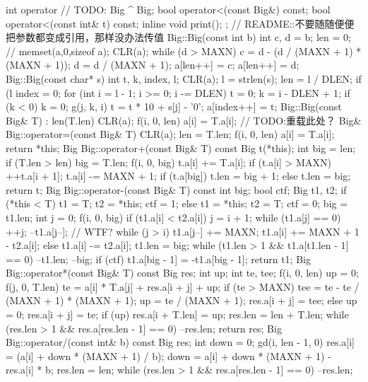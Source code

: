 \begin{cppcode}
{  int operator%
  // TODO: Big ^ Big;
  bool operator<(const Big&) const;
  bool operator<(const int& t) const;
  inline void print();
};
// README::不要随随便便把参数都变成引用，那样没办法传值
Big::Big(const int b) {
  int c, d = b;
  len = 0;
  // memset(a,0,sizeof a);
  CLR(a);
  while (d > MAXN) {
    c = d - (d / (MAXN + 1) * (MAXN + 1));
    d = d / (MAXN + 1);
    a[len++] = c;
  }
  a[len++] = d;
}
Big::Big(const char* s) {
  int t, k, index, l;
  CLR(a);
  l = strlen(s);
  len = l / DLEN;
  if (l %
  index = 0;
  for (int i = l - 1; i >= 0; i -= DLEN) {
    t = 0;
    k = i - DLEN + 1;
    if (k < 0) k = 0;
    g(j, k, i) t = t * 10 + s[j] - '0';
    a[index++] = t;
  }
}
Big::Big(const Big& T) : len(T.len) {
  CLR(a);
  f(i, 0, len) a[i] = T.a[i];
  // TODO:重载此处？
}
Big& Big::operator=(const Big& T) {
  CLR(a);
  len = T.len;
  f(i, 0, len) a[i] = T.a[i];
  return *this;
}
Big Big::operator+(const Big& T) const {
  Big t(*this);
  int big = len;
  if (T.len > len) big = T.len;
  f(i, 0, big) {
    t.a[i] += T.a[i];
    if (t.a[i] > MAXN) {
      ++t.a[i + 1];
      t.a[i] -= MAXN + 1;
    }
  }
  if (t.a[big])
    t.len = big + 1;
  else
    t.len = big;
  return t;
}
Big Big::operator-(const Big& T) const {
  int big;
  bool ctf;
  Big t1, t2;
  if (*this < T) {
    t1 = T;
    t2 = *this;
    ctf = 1;
  } else {
    t1 = *this;
    t2 = T;
    ctf = 0;
  }
  big = t1.len;
  int j = 0;
  f(i, 0, big) {
    if (t1.a[i] < t2.a[i]) {
      j = i + 1;
      while (t1.a[j] == 0) ++j;
      --t1.a[j--];
      // WTF?
      while (j > i) t1.a[j--] += MAXN;
      t1.a[i] += MAXN + 1 - t2.a[i];
    } else
      t1.a[i] -= t2.a[i];
  }
  t1.len = big;
  while (t1.len > 1 && t1.a[t1.len - 1] == 0) {
    --t1.len;
    --big;
  }
  if (ctf) t1.a[big - 1] = -t1.a[big - 1];
  return t1;
}
Big Big::operator*(const Big& T) const {
  Big res;
  int up;
  int te, tee;
  f(i, 0, len) {
    up = 0;
    f(j, 0, T.len) {
      te = a[i] * T.a[j] + res.a[i + j] + up;
      if (te > MAXN) {
        tee = te - te / (MAXN + 1) * (MAXN + 1);
        up = te / (MAXN + 1);
        res.a[i + j] = tee;
      } else {
        up = 0;
        res.a[i + j] = te;
      }
    }
    if (up) res.a[i + T.len] = up;
  }
  res.len = len + T.len;
  while (res.len > 1 && res.a[res.len - 1] == 0) --res.len;
  return res;
}
Big Big::operator/(const int& b) const {
  Big res;
  int down = 0;
  gd(i, len - 1, 0) {
    res.a[i] = (a[i] + down * (MAXN + 1) / b);
    down = a[i] + down * (MAXN + 1) - res.a[i] * b;
  }
  res.len = len;
  while (res.len > 1 && res.a[res.len - 1] == 0) --res.len;
}
\end{cppcode}
